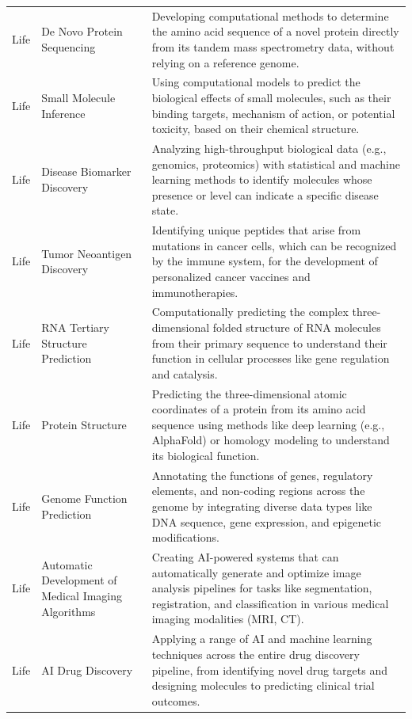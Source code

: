 \begin{longtable}{p{2cm}p{6cm}p{7cm}}
\rowcolor{LifeColor} Life & De Novo Protein Sequencing & Developing computational methods to determine the amino acid sequence of a novel protein directly from its tandem mass spectrometry data, without relying on a reference genome. \\
\rowcolor{LifeColor} Life & Small Molecule Inference & Using computational models to predict the biological effects of small molecules, such as their binding targets, mechanism of action, or potential toxicity, based on their chemical structure. \\
\rowcolor{LifeColor} Life & Disease Biomarker Discovery & Analyzing high-throughput biological data (e.g., genomics, proteomics) with statistical and machine learning methods to identify molecules whose presence or level can indicate a specific disease state. \\
\rowcolor{LifeColor} Life & Tumor Neoantigen Discovery & Identifying unique peptides that arise from mutations in cancer cells, which can be recognized by the immune system, for the development of personalized cancer vaccines and immunotherapies. \\
\rowcolor{LifeColor} Life & RNA Tertiary Structure Prediction & Computationally predicting the complex three-dimensional folded structure of RNA molecules from their primary sequence to understand their function in cellular processes like gene regulation and catalysis. \\
\rowcolor{LifeColor} Life & Protein Structure & Predicting the three-dimensional atomic coordinates of a protein from its amino acid sequence using methods like deep learning (e.g., AlphaFold) or homology modeling to understand its biological function. \\
\rowcolor{LifeColor} Life & Genome Function Prediction & Annotating the functions of genes, regulatory elements, and non-coding regions across the genome by integrating diverse data types like DNA sequence, gene expression, and epigenetic modifications. \\
\rowcolor{LifeColor} Life & Automatic Development of Medical Imaging Algorithms & Creating AI-powered systems that can automatically generate and optimize image analysis pipelines for tasks like segmentation, registration, and classification in various medical imaging modalities (MRI, CT). \\
\rowcolor{LifeColor} Life & AI Drug Discovery & Applying a range of AI and machine learning techniques across the entire drug discovery pipeline, from identifying novel drug targets and designing molecules to predicting clinical trial outcomes. \\

\end{longtable}
